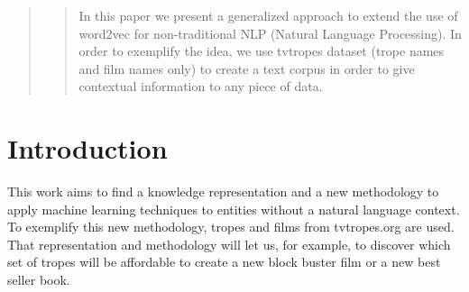 \documentclass[letterpaper]{article}
\begin{document}
 
	\begin{abstract}
		\begin{quote}
			In this paper we present a generalized approach to extend the use of word2vec for non-traditional NLP (Natural Language Processing). In order to exemplify the idea, we use tvtropes dataset (trope names and film names only) to create a text corpus in order to give contextual information to any piece of data.
		\end{quote}
	\end{abstract}
	
	
	
	
	
	\section{Introduction}
	
	
	This work aims to find a knowledge representation and a new
	methodology to apply machine learning techniques to entities without a
	natural language context. %
	To exemplify this new methodology, tropes and films from tvtropes.org
	are used. That representation and methodology will let us, for
	example, to discover which set of tropes will be affordable to create a
	new block buster film or a new best seller book.
	
	
\end{document}
